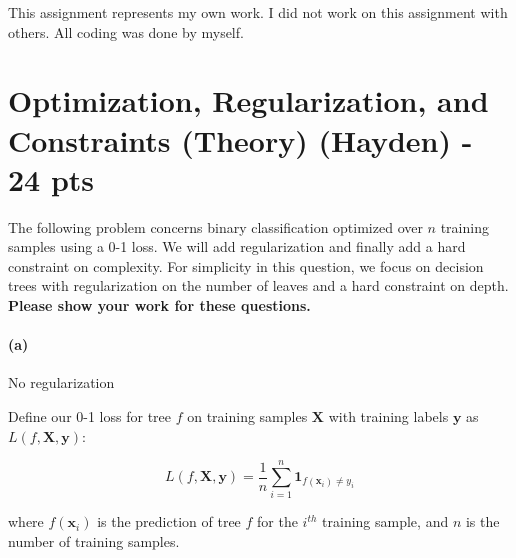 \documentclass{exam}
\begin{document}
This assignment represents my own work. I did not work on this assignment with others. All coding was done by myself. \\

\newpage


\color{black}
\section{Optimization, Regularization, and Constraints (Theory) (Hayden) - 24 pts}
\newcommand{\X}{\mathbf{X}}
\newcommand{\x}{\mathbf{x}}
\newcommand{\y}{\mathbf{y}}

The following problem concerns binary classification optimized over $n$ training samples using a 0-1 loss. We will add regularization and finally add a hard constraint on complexity. For simplicity in this question, we focus on decision trees with regularization on the number of leaves and a hard constraint on depth. 
\textbf{Please show your work for these questions.} 

\paragraph{(a)}No regularization

Define our 0-1 loss for tree $f$ on training samples $\X$ with training labels $\y$ as $L(f, \X, \y)$: 

\begin{equation} \label{eq:noreg}
    L(f, \X, \y) = \frac{1}{n}\sum_{i=1}^n \mathbf{1}_{f(\x_i) \neq y_i}
\end{equation}

where $f(\x_i)$ is the prediction of tree $f$ for the $i^{th}$ training sample, and $n$ is the number of training samples. 
\end{document}
